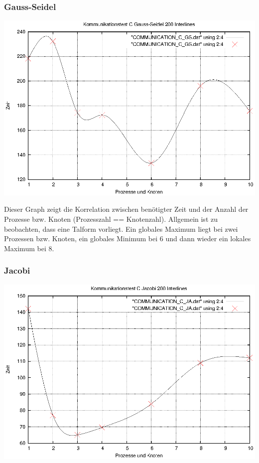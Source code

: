 \documentclass[a4paper,12pt]{scrartcl}
\begin{document}
\subsubsection{Gauss-Seidel}
\begin{multicols}{2}
\includegraphics[scale=0.5]{results/COMMUNICATION_C_GS.eps}

\end{multicols}

Dieser Graph zeigt die Korrelation zwischen benötigter Zeit und
der Anzahl der Prozesse bzw. Knoten (Prozesszahl == Knotenzahl).
Allgemein ist zu beobachten, dass eine Talform vorliegt. Ein globales
Maximum liegt bei zwei Prozessen bzw. Knoten, ein globales Minimum bei 6
und dann wieder ein lokales Maximum bei 8.

\subsubsection{Jacobi}
\begin{multicols}{2}
\includegraphics[scale=0.5]{results/COMMUNICATION_C_JA.eps}

\end{multicols}
\end{document}

